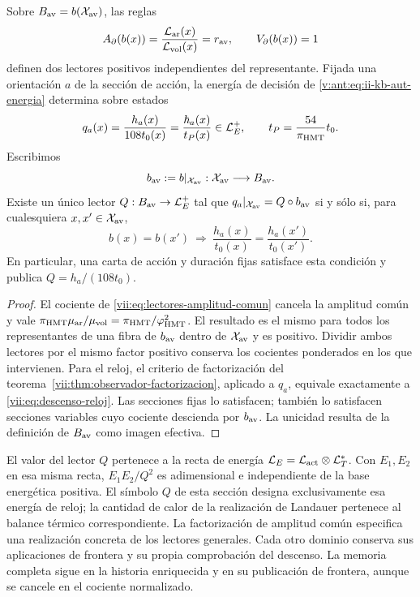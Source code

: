 \begin{proposition}
\label{vii:prop:lectores-frontera-explicitos}
Sobre \(B_{\rm av}=b(\mathcal X_{\rm av})\), las reglas
\begin{equation}
 A_\partial(b(x))
 =\frac{\mathcal L_{\rm ar}(x)}{\mathcal L_{\rm vol}(x)}
 =r_{\rm av},\qquad V_\partial(b(x))=1
 \label{vii:eq:lectores-normalizados}
\end{equation}
definen dos lectores positivos independientes del representante.
Fijada una orientación \(a\) de la sección de acción, la energía de
decisión de \eqref{v:ant:eq:ii-kb-aut-energia} determina sobre estados
\begin{equation}
 q_a(x)=\frac{h_a(x)}{108t_0(x)}
       =\frac{\hbar_a(x)}{t_P(x)}\in\mathcal L_E^+,
 \qquad t_P=\frac{54}{\pi_{\rm HMT}}t_0.
 \label{vii:eq:lector-q-accion}
\end{equation}
Escribimos
\[
 b_{\rm av}:=b|_{\mathcal X_{\rm av}}:
 \mathcal X_{\rm av}\longrightarrow B_{\rm av}.
\]
Existe un único lector \(Q:B_{\rm av}\to\mathcal L_E^+\) tal que
\(q_a|_{\mathcal X_{\rm av}}=Q\circ b_{\rm av}\)
si y sólo si, para cualesquiera \(x,x'\in\mathcal X_{\rm av}\),
\begin{equation}
 b(x)=b(x')\ \Longrightarrow\
 \frac{h_a(x)}{t_0(x)}=\frac{h_a(x')}{t_0(x')}.
 \label{vii:eq:descenso-reloj}
\end{equation}
En particular, una carta de acción y duración fijas satisface esta
condición y publica \(Q=h_a/(108t_0)\).
\end{proposition}
\begin{proof}
El cociente de \eqref{vii:eq:lectores-amplitud-comun} cancela la
amplitud común y vale
\(\pi_{\rm HMT}\mu_{\rm ar}/\mu_{\rm vol}
=\pi_{\rm HMT}/\varphi_{\rm HMT}^2\).
El resultado es el mismo para todos los representantes de una fibra
de \(b_{\rm av}\) dentro de \(\mathcal X_{\rm av}\) y es positivo.
Dividir ambos lectores por el mismo factor positivo
conserva los cocientes ponderados en los que intervienen.
Para el reloj, el criterio de factorización del
teorema~\ref{vii:thm:observador-factorizacion}, aplicado a \(q_a\),
equivale exactamente a \eqref{vii:eq:descenso-reloj}. Las secciones
fijas lo satisfacen; también lo satisfacen secciones variables cuyo
cociente descienda por \(b_{\rm av}\). La unicidad resulta de la definición
de \(B_{\rm av}\) como imagen efectiva.
\end{proof}

El valor del lector \(Q\) pertenece a la recta de energía
\(\mathcal L_E=\mathcal L_{\rm act}\otimes\mathcal L_T^*\).
Con \(E_1,E_2\) en esa misma recta,
\(E_1E_2/Q^2\) es adimensional e independiente de la base energética
positiva. El símbolo \(Q\) de esta sección designa exclusivamente
esa energía de reloj; la cantidad de calor de la realización de
Landauer pertenece al balance térmico correspondiente.
La factorización de amplitud común especifica una realización
concreta de los lectores generales. Cada otro dominio conserva sus
aplicaciones de frontera y su propia comprobación del descenso.
La memoria completa sigue en la historia enriquecida y en su
publicación de frontera, aunque se cancele en el cociente normalizado.



